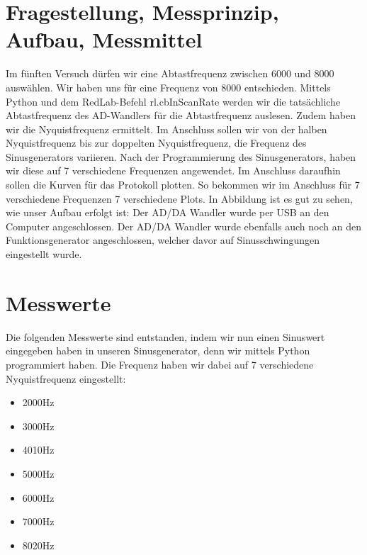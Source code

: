 \documentclass[12pt, oneside, a4paper, \docLanguage]{report}
\begin{document}
\section{Fragestellung, Messprinzip, Aufbau, Messmittel}
\label{chap:VERSUCH_5_FRAGESTELLUNG}
Im fünften Versuch dürfen wir eine Abtastfrequenz zwischen 6000 und 8000 auswählen. Wir haben uns für eine Frequenz von 8000 entschieden. Mittels Python und dem RedLab-Befehl rl.cbInScanRate werden wir die tatsächliche Abtastfrequenz des AD-Wandlers für die Abtastfrequenz auslesen. 
\newline
Zudem haben wir die Nyquistfrequenz ermittelt.
Im Anschluss sollen wir von der halben Nyquistfrequenz bis zur doppelten Nyquistfrequenz, die Frequenz des Sinusgenerators variieren. 
Nach der Programmierung des Sinusgenerators, haben wir diese auf 7 verschiedene Frequenzen angewendet.
\newline
Im Anschluss daraufhin sollen die Kurven für das Protokoll plotten.
So bekommen wir im Anschluss für 7 verschiedene Frequenzen 7 verschiedene Plots.
\newline
In Abbildung ist es gut zu sehen, wie unser Aufbau erfolgt ist:
\newline
Der AD/DA Wandler wurde per USB an den Computer angeschlossen. Der AD/DA Wandler wurde ebenfalls auch noch an den Funktionsgenerator angeschlossen, welcher davor auf Sinusschwingungen eingestellt wurde.
\newpage
\section{Messwerte}
\label{chap:VERSUCH_5_MESSWERTE}
Die folgenden Messwerte sind entstanden, indem wir nun einen Sinuswert eingegeben haben in unseren Sinusgenerator, denn wir mittels Python programmiert haben.
Die Frequenz haben wir dabei auf 7 verschiedene Nyquistfrequenz eingestellt:
\begin{itemize}
\item 2000Hz
\item 3000Hz
\item 4010Hz
\item 5000Hz
\item 6000Hz
\item 7000Hz
\item 8020Hz
\end{itemize}
\end{document}
